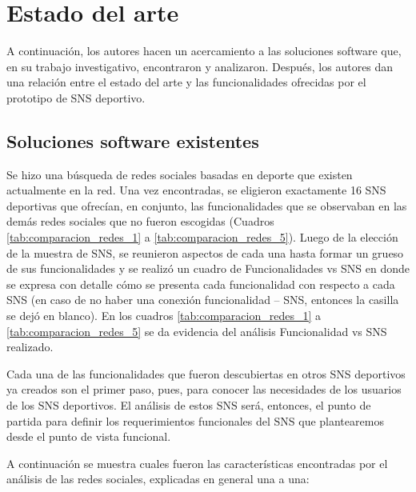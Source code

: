 \clearpage

\section{Estado del arte} \label{cap:estado_arte}

A continuación, los autores hacen un acercamiento a las soluciones software que, en su trabajo investigativo, encontraron y analizaron. Después, los autores dan una relación entre el estado del arte y las funcionalidades ofrecidas por el prototipo de SNS deportivo.

\subsection{Soluciones software existentes}

Se hizo una búsqueda de redes sociales basadas en deporte que existen actualmente en la red. Una vez encontradas, se eligieron exactamente 16 SNS deportivas que ofrecían, en conjunto, las funcionalidades que se observaban en las demás redes sociales que no fueron escogidas (Cuadros \ref{tab:comparacion_redes_1} a \ref{tab:comparacion_redes_5}). Luego de la elección de la muestra de SNS, se reunieron aspectos de cada una hasta formar un grueso de sus funcionalidades y se realizó un cuadro de Funcionalidades vs SNS en donde se expresa con detalle cómo se presenta cada funcionalidad con respecto a cada SNS (en caso de no haber una conexión funcionalidad – SNS, entonces la casilla se dejó en blanco). En los cuadros \ref{tab:comparacion_redes_1} a \ref{tab:comparacion_redes_5} se da evidencia del análisis Funcionalidad vs SNS realizado.

Cada una de las funcionalidades que fueron descubiertas en otros SNS deportivos ya creados son el primer paso, pues, para conocer las necesidades de los usuarios de los SNS deportivos. El análisis de estos SNS será, entonces, el punto de partida para definir los requerimientos funcionales del SNS que plantearemos desde el punto de vista funcional.

A continuación se muestra cuales fueron las características encontradas por el análisis de las redes sociales, explicadas en general una a una:

